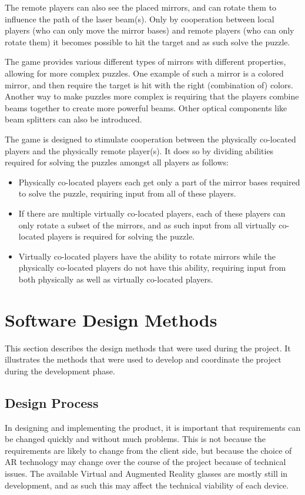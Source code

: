     The remote players can also see the placed mirrors, and can rotate them
    to influence the path of the laser beam(s). Only by cooperation between
    local players (who can only move the mirror bases) and remote players
    (who can only rotate them) it becomes possible to hit the target and as
    such solve the puzzle.

    The game provides various different types of mirrors with different
    properties, allowing for more complex puzzles. One example of such a
    mirror is a colored mirror, and then require the target is hit with the
    right (combination of) colors. Another way to make puzzles more complex
    is requiring that the players combine beams together to create more
    powerful beams. Other optical components like beam splitters can also be introduced.

    The game is designed to stimulate cooperation between the physically
    co-located players and the physically remote player(s). It does so by
    dividing abilities required for solving the puzzles amongst all players
    as follows:

    \begin{itemize}
      \item Physically co-located players each get only a part of the
            mirror bases required to solve the puzzle, requiring input
            from all of these players.
      \item If there are multiple virtually co-located players, each of
            these players can only rotate a subset of the mirrors, and
            as such input from all virtually co-located players is
            required for solving the puzzle.
      \item Virtually co-located players have the ability to rotate
            mirrors while the physically co-located players do not have
            this ability, requiring input from both physically as well
            as virtually co-located players.
    \end{itemize}


  \section{Software Design Methods} \label{sec:designmethods}
    This section describes the design methods that were used during the
    project. It illustrates the methods that were used to develop and
    coordinate the project during the development phase.

    \subsection{Design Process} \label{ssec:designprocess}
      In designing and implementing the product, it is important that
      requirements can be changed quickly and without much problems. This is
      not because the requirements are likely to change from the client
      side, but because the choice of AR technology may change over the
      course of the project because of technical issues. The available Virtual
      and Augmented Reality glasses are mostly still in development, and as
      such this may affect the technical viability of each device.

